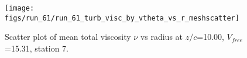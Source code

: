 \begin{figure}[H]
\centering
\texttt{[image: figs/run\_61/run\_61\_turb\_visc\_by\_vtheta\_vs\_r\_meshscatter]}
\caption{Scatter plot of mean total viscosity $\nu$ vs radius at $z/c$=10.00, $V_{free}$=15.31, station 7.}
\label{fig:run_61_turb_visc_by_vtheta_vs_r_meshscatter}
\end{figure}


